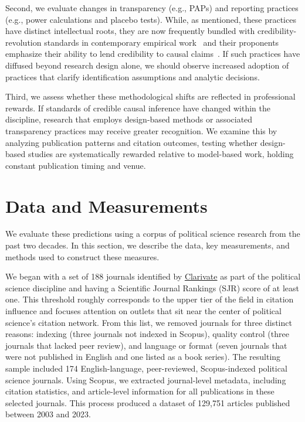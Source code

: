 \documentclass[12pt]{article}
\begin{document}
Second, we evaluate changes in transparency (e.g., PAPs) and reporting practices (e.g., power calculations and placebo tests). While, as mentioned, these practices have distinct intellectual roots, they are now frequently bundled with credibility-revolution standards in contemporary empirical work~\citep{blair2023research} and their proponents emphasize their ability to lend credibility to causal claims~\citep{sekhon2009opiate}. If such practices have diffused beyond research design alone, we should observe increased adoption of practices that clarify identification assumptions and analytic decisions.

Third, we assess whether these methodological shifts are reflected in professional rewards. If standards of credible causal inference have changed within the discipline, research that employs design-based methods or associated transparency practices may receive greater recognition. We examine this by analyzing publication patterns and citation outcomes, testing whether design-based studies are systematically rewarded relative to model-based work, holding constant publication timing and venue.

\section*{Data and Measurements}\label{sec:data}

We evaluate these predictions using a corpus of political science research from the past two decades. In this section, we describe the data, key measurements, and methods used to construct these measures.

We began with a set of 188 journals identified by \href{https://clarivate.com}{Clarivate} as part of the political science discipline and having a Scientific Journal Rankings (SJR) score of at least one. This threshold roughly corresponds to the upper tier of the field in citation influence and focuses attention on outlets that sit near the center of political science's citation network. From this list, we removed journals for three distinct reasons: indexing (three journals not indexed in Scopus), quality control (three journals that lacked peer review), and language or format (seven journals that were not published in English and one listed as a book series). The resulting sample included 174 English-language, peer-reviewed, Scopus-indexed political science journals. Using Scopus, we extracted journal-level metadata, including citation statistics, and article-level information for all publications in these selected journals. This process produced a dataset of 129,751 articles published between 2003 and 2023. 
\end{document}
